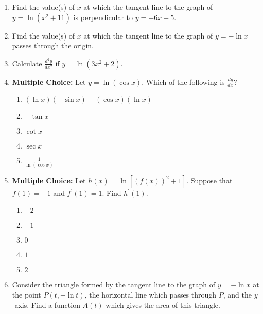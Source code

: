 \documentclass[12pt]{article}
\newif\ifans
\begin{document}
\begin{enumerate}
\ifans{\fbox{$y=4x-8$}} \fi

\item Find the value(s) of $x$ at which the tangent line to the graph of $y=\ln{(x^2+11)}$  is perpendicular to $y=-6x+5$.

\ifans{\fbox{$x=1$ and $x=11$}} \fi

\item Find the value(s) of $x$ at which the tangent line to the graph of $y=-\ln{x}$ passes through the origin.

\ifans{\fbox{$x=e$}} \fi

\item Calculate $\frac{d^2y}{dx^2}$ if $y=\ln{(3x^2+2)}$.

\ifans{\fbox{$\frac{12-18x^2}{(3x^2+2)^2}$}} \fi

\item {\bf Multiple Choice:} Let $y=\ln{(\cos{x})}$.  Which of the following is $\frac{dy}{dx}$?

\begin{enumerate}

\item $(\ln{x})(-\sin{x})+(\cos{x})(\ln{x})$

\item $-\tan{x}$

\item $\cot{x}$

\item $\sec{x}$

\item $\frac{1}{\ln{(\cos{x})}}$

\end{enumerate}

\ifans{\fbox{B}} \fi

\item {\bf Multiple Choice:} Let $h(x)=\ln[(f(x))^2+1]$.  Suppose that $f(1)=-1$ and $f^{\prime}(1)=1$.  Find $h^{\prime}(1)$.

\begin{enumerate}

\item $-2$

\item $-1$

\item $0$

\item $1$

\item $2$

\end{enumerate}

\ifans{\fbox{B}} \fi

\item Consider the triangle formed by the tangent line to the graph of $y=-\ln{x}$ at the point $P(t,-\ln{t})$, the horizontal line which passes through $P$, and the $y$-axis. Find a function $A(t)$ which gives the area of this triangle.  

\ifans{\fbox{$A(t)=\frac{1}{2}t$}} \fi

\end{enumerate}
\end{document}
